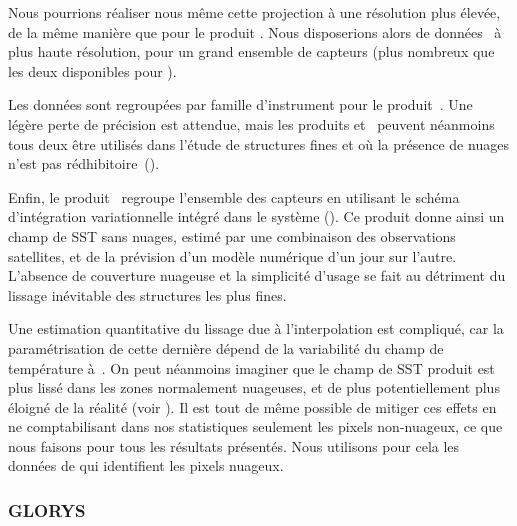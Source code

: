 \begin{note}
  Nous pourrions réaliser nous même cette projection à une résolution plus élevée, de la même manière que pour le produit .
  Nous disposerions alors de données~ à plus haute résolution, pour un grand ensemble de capteurs (plus nombreux que les deux disponibles pour ).
\end{note}

Les données sont regroupées par famille d'instrument pour le produit~. Une légère perte de précision est attendue, mais les produits  et~ peuvent néanmoins tous deux être utilisés dans l'étude de structures fines et où la présence de nuages n'est pas rédhibitoire~(\cite{merchant_2019}).

Enfin, le produit~ regroupe l'ensemble des capteurs en utilisant le schéma d'intégration variationnelle  intégré dans le système  (\cite{good_2020}).
Ce produit donne ainsi un champ de SST sans nuages, estimé par une combinaison des observations satellites, et de la prévision d'un modèle numérique d'un jour sur l'autre.
L'absence de couverture nuageuse et la simplicité d'usage se fait au détriment du lissage inévitable des structures les plus fines.

Une estimation quantitative du lissage due à l'interpolation est compliqué, car la paramétrisation de cette dernière dépend de la variabilité du champ de température à~.
On peut néanmoins imaginer que le champ de SST produit est plus lissé dans les zones normalement nuageuses, et de plus potentiellement plus éloigné de la réalité (voir ).
Il est tout de même possible de mitiger ces effets en ne comptabilisant dans nos statistiques seulement les pixels non-nuageux, ce que nous faisons pour tous les résultats présentés.
Nous utilisons pour cela les données de  qui identifient les pixels nuageux.

\subsubsection{GLORYS}

